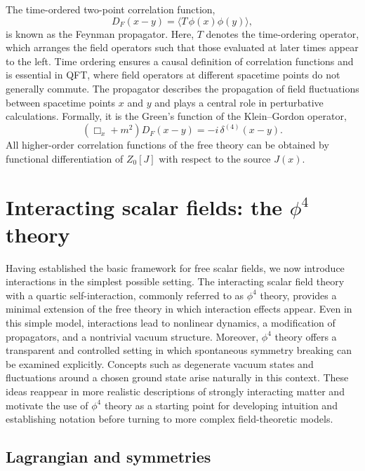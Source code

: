 The time-ordered two-point correlation function,
\begin{equation}
D_F(x-y)
= \langle T\,\phi(x)\phi(y)\rangle ,
\end{equation}
is known as the Feynman propagator. Here, $T$ denotes the time-ordering
operator, which arranges the field operators such that those evaluated at later
times appear to the left. Time ordering ensures a causal definition of
correlation functions and is essential in QFT,
where field operators at different spacetime points do not generally commute.
The propagator describes the propagation of field fluctuations between
spacetime points $x$ and $y$ and plays a central role in perturbative
calculations. Formally, it is the Green's function of the Klein--Gordon
operator,
\begin{equation}
(\Box_x + m^2) D_F(x-y) = -i\,\delta^{(4)}(x-y) .
\end{equation}
All higher-order correlation functions of the free theory can be obtained by
functional differentiation of $Z_0[J]$ with respect to the source $J(x)$.

\section{Interacting scalar fields: the \texorpdfstring{$\phi^4$}{phi4} theory}
\label{sec:phi4_theory}

Having established the basic framework for free scalar fields, we now introduce
interactions in the simplest possible setting. The interacting scalar field
theory with a quartic self-interaction, commonly referred to as $\phi^4$ theory,
provides a minimal extension of the free theory in which interaction
effects appear. Even in this simple model, interactions lead to nonlinear
dynamics, a modification of propagators, and a nontrivial vacuum structure.
Moreover, $\phi^4$ theory offers a transparent and controlled setting in which
spontaneous symmetry breaking can be examined explicitly. Concepts such as
degenerate vacuum states and fluctuations around a chosen ground state arise
naturally in this context. These ideas reappear in more realistic descriptions
of strongly interacting matter and motivate the use of $\phi^4$ theory as a
starting point for developing intuition and establishing notation before
turning to more complex field-theoretic models.

\subsection*{Lagrangian and symmetries}

